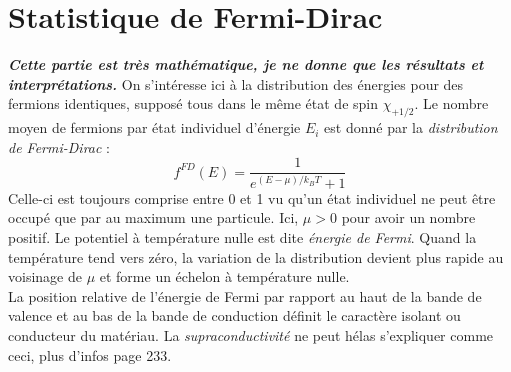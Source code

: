\documentclass	[11pt, a4paper, openany]{book}
\begin{document}
\section{Statistique de Fermi-Dirac}
\textit{\textbf{Cette partie est très mathématique, je ne donne que les résultats et interprétations.}}
On s'intéresse ici à la distribution des énergies pour des fermions identiques, supposé tous dans le 
même état de spin $\chi_{+1/2}$. Le nombre moyen de fermions par état individuel d'énergie $E_i$ est 
donné par la \textit{distribution de Fermi-Dirac} :
\begin{equation}
f^{FD}(E) = \frac{1}{e^{(E-\mu)/k_BT}+1}
\end{equation}
Celle-ci est toujours comprise entre 0 et 1 vu qu'un état individuel ne peut être occupé que par au 
maximum une particule. Ici, $\mu > 0$ pour avoir un nombre positif. Le potentiel à température nulle 
est dite \textit{énergie de Fermi}. Quand la température tend vers zéro, la variation de la distribution
devient plus rapide au voisinage de $\mu$ et forme un échelon à température nulle. \\
La position relative de l'énergie de Fermi par rapport au haut de la bande de valence et au bas de la bande
de conduction définit le caractère isolant ou conducteur du matériau. La \textit{supraconductivité} ne peut 
hélas s'expliquer comme ceci, plus d'infos page 233.


















	
\end{document}
